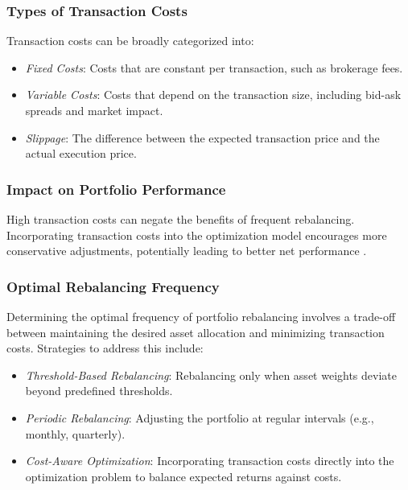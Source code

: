 \subsubsection{Types of Transaction Costs}

Transaction costs can be broadly categorized into:

\begin{itemize}
    \item \textit{Fixed Costs}: Costs that are constant per transaction, such as brokerage fees.
    \item \textit{Variable Costs}: Costs that depend on the transaction size, including bid-ask spreads and market impact.
    \item \textit{Slippage}: The difference between the expected transaction price and the actual execution price.
\end{itemize}

\subsubsection{Impact on Portfolio Performance}

High transaction costs can negate the benefits of frequent rebalancing. Incorporating transaction costs into the optimization model encourages more conservative adjustments, potentially leading to better net performance \cite{garleanu2009dynamic}.

\subsubsection{Optimal Rebalancing Frequency}

Determining the optimal frequency of portfolio rebalancing involves a trade-off between maintaining the desired asset allocation and minimizing transaction costs. Strategies to address this include:

\begin{itemize}
    \item \textit{Threshold-Based Rebalancing}: Rebalancing only when asset weights deviate beyond predefined thresholds.
    \item \textit{Periodic Rebalancing}: Adjusting the portfolio at regular intervals (e.g., monthly, quarterly).
    \item \textit{Cost-Aware Optimization}: Incorporating transaction costs directly into the optimization problem to balance expected returns against costs.
\end{itemize}

